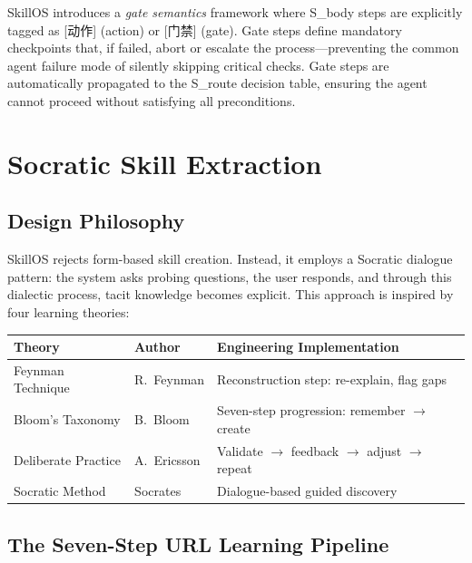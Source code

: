 \documentclass[11pt]{article}
\begin{document}
SkillOS introduces a \textit{gate semantics} framework where S\_body steps are explicitly tagged as [动作] (action) or [门禁] (gate). Gate steps define mandatory checkpoints that, if failed, abort or escalate the process---preventing the common agent failure mode of silently skipping critical checks. Gate steps are automatically propagated to the S\_route decision table, ensuring the agent cannot proceed without satisfying all preconditions.

\section{Socratic Skill Extraction}
\label{sec:extraction}

\subsection{Design Philosophy}

SkillOS rejects form-based skill creation. Instead, it employs a Socratic dialogue pattern: the system asks probing questions, the user responds, and through this dialectic process, tacit knowledge becomes explicit. This approach is inspired by four learning theories:

\begin{center}
\begin{tabular}{lll}
\toprule
\textbf{Theory} & \textbf{Author} & \textbf{Engineering Implementation} \\
\midrule
Feynman Technique     & R.~Feynman  & Reconstruction step: re-explain, flag gaps \\
Bloom's Taxonomy      & B.~Bloom    & Seven-step progression: remember $\rightarrow$ create \\
Deliberate Practice   & A.~Ericsson & Validate $\rightarrow$ feedback $\rightarrow$ adjust $\rightarrow$ repeat \\
Socratic Method       & Socrates    & Dialogue-based guided discovery \\
\bottomrule
\end{tabular}
\end{center}

\subsection{The Seven-Step URL Learning Pipeline}
\end{document}
